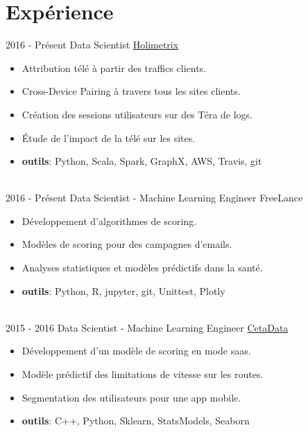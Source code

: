 \documentclass[letterpaper]{twentysecondcvfr} %
\begin{document}
\makeprofile %



\section{Exp\'erience}{\faAlignJustify}

\begin{twenty} %
\twentyitem
    	{2016 -}
		{Pr\'esent}
        {Data Scientist}
        {\href{http://www.holimetrix.ccom/}{Holimetrix}}
        {}
        {
				\begin{itemize}
				\item Attribution t\'el\'e \`a partir des traffics clients. 
				\item Cross-Device Pairing \`a travers tous les sites clients.
				\item Cr\'eation des sessions utilisateurs sur des T\'era de logs.
				\item \'Etude de l'impact de la t\'el\'e sur les sites.
				\item \textbf{outils}: Python, Scala, Spark, GraphX, AWS, Travis, git
				\end{itemize}} \\
				
	\twentyitem
    	{2016 -}
		{Pr\'esent}
        {Data Scientist - Machine Learning Engineer}
        {FreeLance}
        {}
        {\begin{itemize}
        \item D\'eveloppement d'algorithmes de scoring.
        \item Mod\`eles de scoring pour des campagnes d'emails. 
        \item Analyses statistiques et mod\`eles pr\'edictifs dans la sant\'e. 
				\item \textbf{outils}: Python, R, jupyter, git, Unittest, Plotly
    \end{itemize}}\\
		
    \twentyitem
   		{2015 - 2016}
		{}
        {Data Scientist - Machine Learning Engineer}
        {\href{http://www.cetadata.com/}{CetaData}}
        {}
        {\begin{itemize}
				\item D\'eveloppement d'un mod\`ele de scoring en mode saas.
        \item Mod\`ele pr\'edictif des limitations de vitesse sur les routes.
				\item Segmentation des utilisateurs pour une app mobile.
				\item \textbf{outils}: C++, Python, Sklearn, StatsModels, Seaborn
    \end{itemize}} \\
		

\end{twenty}
\end{document}
